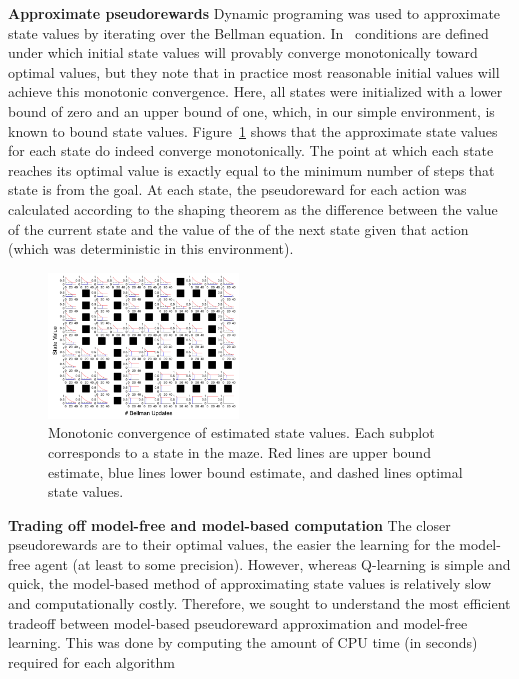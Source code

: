 \documentclass[letterpaper]{article}
\begin{document}
\noindent
\textbf{Approximate pseudorewards} Dynamic programing was used to approximate state values by iterating over the Bellman equation. In~\cite{mcmahan2005bounded} conditions are defined under which initial state values will provably converge monotonically toward optimal values, but they note that in practice most reasonable initial values will achieve this monotonic convergence. Here, all states were initialized with a lower bound of zero and an upper bound of one, which, in our simple environment, is known to bound state values. Figure~\ref{fig:value_bounds} shows that the approximate state values for each state do indeed converge monotonically. The point at which each state reaches its optimal value is exactly equal to the minimum number of steps that state is from the goal. At each state, the pseudoreward for each action was calculated according to the shaping theorem as the difference between the value of the current state and the value of the of the next state given that action (which was deterministic in this environment). 

\begin{figure}[ht]
\centering
\includegraphics[width=0.45\textwidth]{value_bounds_labeled}
\caption{Monotonic convergence of estimated state values. Each subplot corresponds to a state in the maze. Red lines are upper bound estimate, blue lines lower bound estimate, and dashed lines optimal state values.}
\label{fig:value_bounds}
\end{figure}



\noindent
\textbf{Trading off model-free and model-based computation} The closer pseudorewards are to their optimal values, the easier the learning for the model-free agent (at least to some precision). However, whereas Q-learning is simple and quick, the model-based method of approximating state values is relatively slow and computationally costly. Therefore, we sought to understand the most efficient tradeoff between model-based pseudoreward approximation and model-free learning. This was done by computing the amount of CPU time (in seconds) required for each algorithm
\end{document}
